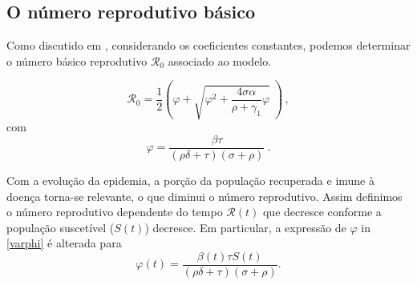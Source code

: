 \subsection{O número reprodutivo básico}
\label{sec:R0}

Como discutido em \cite{aronna2021}, considerando os coeficientes constantes,
podemos determinar o número básico reprodutivo $\mathcal{R}_0$ associado ao
modelo. 

\begin{equation}\label{R0wheneps=0}
\mathcal{R}_0 = \frac{1}{2}\left(
\varphi + \sqrt{\varphi^2 + \frac{4\sigma\alpha}{\rho + \gamma_1}\varphi}\;
\right)\, ,
\end{equation}
com
\begin{equation}
\label{varphi}
    \varphi = \frac{\beta \tau}{(\rho\delta + \tau)(\sigma + \rho)}\ .
\end{equation}

Com a evolução da epidemia, a porção da população recuperada e imune à doença torna-se relevante, o que diminui o número reprodutivo. Assim definimos o número
reprodutivo dependente do tempo $\mathcal{R}(t)$ que decresce conforme a população suscetível ($S(t)$) decresce. Em particular, a expressão de
$\varphi$ in \eqref{varphi} é alterada para 
\begin{equation}
    \varphi(t) = \frac{\beta(t) \tau S(t)}{(\rho\delta + \tau)(\sigma + \rho)}.
\end{equation}